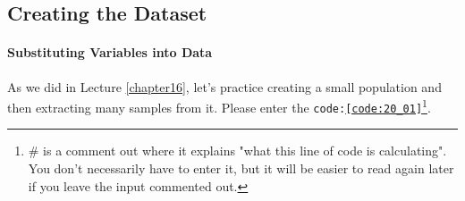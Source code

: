 \documentclass{ltjsbook}
\begin{document}
\subsection{Creating the Dataset}
\paragraph{Substituting Variables into Data}
As we did in Lecture \ref{chapter16}, let's practice creating a small population and then extracting many samples from it. Please enter the \texttt{code:\ref{code:20_01}}\footnote{\# is a comment out where it explains "what this line of code is calculating". You don't necessarily have to enter it, but it will be easier to read again later if you leave the input commented out.}.


\end{document}
